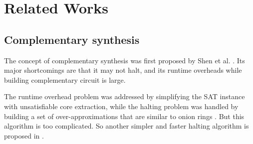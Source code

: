\documentclass[journal]{IEEEtran}
\begin{document}
%
%
%
%

\section{Related Works}\label{sec_relwork}

\subsection{Complementary synthesis}\label{subsec_compsyn_relat}
The concept of complementary synthesis was first proposed by Shen et al. \cite{ShengYuShen:iccad09}.
Its major shortcomings are that it may not halt,
and its runtime overheads while building complementary circuit is large.

The runtime overhead problem was addressed by simplifying the SAT instance with unsatisfiable core extraction\cite{ShengYuShen:tcad},
while the halting problem was handled by building a set of over-approximations that are similar to onion rings \cite{ShengYuShen:fmcad10}.
But this algorithm is too complicated.
So another simpler and faster halting algorithm is proposed in \cite{ShengYuShen:tcad11}.
\end{document}
